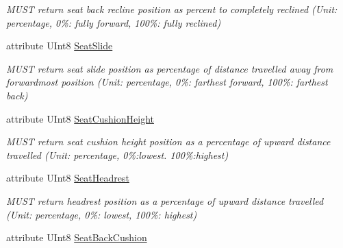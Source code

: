 \begin{DoxyCompactItemize}
\begin{DoxyCompactList}\small\item\em M\+U\+S\+T return seat back recline position as percent to completely reclined (Unit\+: percentage, 0\%\+: fully forward, 100\%\+: fully reclined) \end{DoxyCompactList}\item 
\hypertarget{interfaceVehiclePropertyType_a68b9b0518a804488a3190dbb58f49c3b}{attribute U\+Int8 \hyperlink{interfaceVehiclePropertyType_a68b9b0518a804488a3190dbb58f49c3b}{Seat\+Slide}}\label{interfaceVehiclePropertyType_a68b9b0518a804488a3190dbb58f49c3b}

\begin{DoxyCompactList}\small\item\em M\+U\+S\+T return seat slide position as percentage of distance travelled away from forwardmost position (Unit\+: percentage, 0\%\+: farthest forward, 100\%\+: farthest back) \end{DoxyCompactList}\item 
\hypertarget{interfaceVehiclePropertyType_a5fe1b23b030d9c43d8ae2301834f30d5}{attribute U\+Int8 \hyperlink{interfaceVehiclePropertyType_a5fe1b23b030d9c43d8ae2301834f30d5}{Seat\+Cushion\+Height}}\label{interfaceVehiclePropertyType_a5fe1b23b030d9c43d8ae2301834f30d5}

\begin{DoxyCompactList}\small\item\em M\+U\+S\+T return seat cushion height position as a percentage of upward distance travelled (Unit\+: percentage, 0\%\+:lowest. 100\%\+:highest) \end{DoxyCompactList}\item 
\hypertarget{interfaceVehiclePropertyType_ac076265fd8c5ef7ce6463f9a56988478}{attribute U\+Int8 \hyperlink{interfaceVehiclePropertyType_ac076265fd8c5ef7ce6463f9a56988478}{Seat\+Headrest}}\label{interfaceVehiclePropertyType_ac076265fd8c5ef7ce6463f9a56988478}

\begin{DoxyCompactList}\small\item\em M\+U\+S\+T return headrest position as a percentage of upward distance travelled (Unit\+: percentage, 0\%\+: lowest, 100\%\+: highest) \end{DoxyCompactList}\item 
\hypertarget{interfaceVehiclePropertyType_a96083e67905572a50e29d3d5e9385230}{attribute U\+Int8 \hyperlink{interfaceVehiclePropertyType_a96083e67905572a50e29d3d5e9385230}{Seat\+Back\+Cushion}}\label{interfaceVehiclePropertyType_a96083e67905572a50e29d3d5e9385230}


\end{DoxyCompactItemize}
